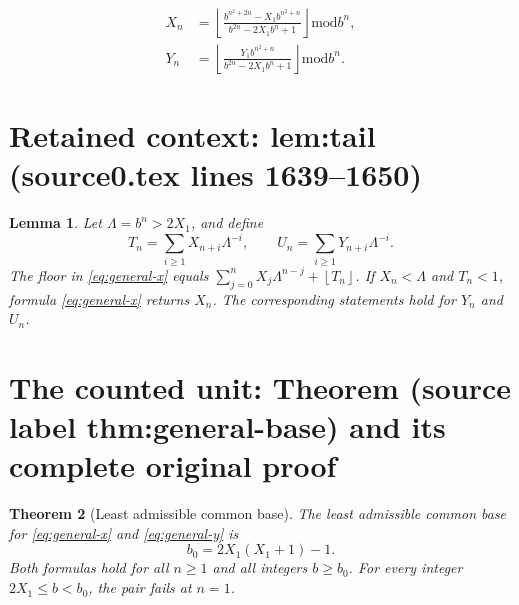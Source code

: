 \documentclass[10pt,a4paper]{amsart}
\newcommand{\fl}[1]{\left\lfloor #1\right\rfloor}
\newcommand{\md}{\mathbin{\mathrm{mod}}}
\theoremstyle{plain}
\newtheorem{theorem}{Theorem}
\newtheorem{lemma}[theorem]{Lemma}
\theoremstyle{remark}
\begin{document}
\begin{align}
  X_n&=\fl{\frac{b^{n^2+2n}-X_1b^{n^2+n}}
                  {b^{2n}-2X_1b^n+1}}\md b^n,\label{eq:general-x}\\
  Y_n&=\fl{\frac{Y_1b^{n^2+n}}
                  {b^{2n}-2X_1b^n+1}}\md b^n.\label{eq:general-y}
\end{align}


\section*{Retained context: lem:tail (source0.tex lines 1639--1650)}

\begin{lemma}\label{lem:tail}
Let $\Lambda=b^n>2X_1$, and define
\[
  T_n=\sum_{i\ge1}X_{n+i}\Lambda^{-i},\qquad
  U_n=\sum_{i\ge1}Y_{n+i}\Lambda^{-i}.
\]
The floor in \eqref{eq:general-x} equals
$\sum_{j=0}^n X_j\Lambda^{n-j}+\fl{T_n}$.
If $X_n<\Lambda$ and $T_n<1$, formula \eqref{eq:general-x}
returns $X_n$.
The corresponding statements hold for $Y_n$ and $U_n$.
\end{lemma}


\section{The counted unit: Theorem (source label thm:general-base) and its complete original proof}

\begin{theorem}[Least admissible common base]\label{thm:general-base}
The least admissible common base for \eqref{eq:general-x} and
\eqref{eq:general-y} is
\begin{equation}\label{eq:base}
  b_0=2X_1(X_1+1)-1.
\end{equation}
Both formulas hold for all $n\ge1$ and all integers $b\ge b_0$.
For every integer $2X_1\le b<b_0$, the pair fails at $n=1$.
\end{theorem}
\end{document}
